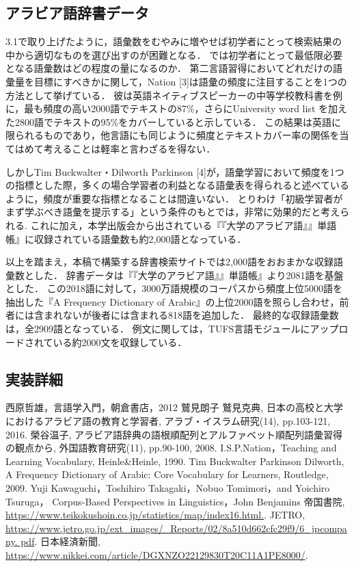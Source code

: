 \documentclass[technicalreport]{ieicej}
\begin{document}
\subsection{アラビア語辞書データ}
3.1で取り上げたように，語彙数をむやみに増やせば初学者にとって検索結果の中から適切なものを選び出すのが困難となる．
では初学者にとって最低限必要となる語彙数はどの程度の量になるのか．
第二言語習得においてどれだけの語彙量を目標にすべきかに関して，Nation [3]は語彙の頻度に注目することを1つの方法として挙げている．
彼は英語ネイティブスピーカーの中等学校教科書を例に，最も頻度の高い2000語でテキストの87\%，さらにUniversity word list を加えた2800語でテキストの95\%をカバーしていると示している．
この結果は英語に限られるものであり，他言語にも同じように頻度とテキストカバー率の関係を当てはめて考えることは軽率と言わざるを得ない．

しかしTim Buckwalter・Dilworth Parkinson [4]が，語彙学習において頻度を1つの指標とした際，多くの場合学習者の利益となる語彙表を得られると述べているように，頻度が重要な指標となることは間違いない．
とりわけ「初級学習者がまず学ぶべき語彙を提示する」という条件のもとでは，非常に効果的だと考えられる.
これに加え，本学出版会から出されている『『大学のアラビア語』』単語帳』に収録されている語彙数も約2,000語となっている．

以上を踏まえ，本稿で構築する辞書検索サイトでは2,000語をおおまかな収録語彙数とした．
辞書データは『『大学のアラビア語』』単語帳』より2081語を基盤とした．
この2018語に対して，3000万語規模のコーパスから頻度上位5000語を抽出した『A Frequency Dictionary of Arabic』の上位2000語を照らし合わせ，前者には含まれないが後者には含まれる818語を追加した．
最終的な収録語彙数は，全2909語となっている．
例文に関しては，TUFS言語モジュール\cite{kawaguchi2007}にアップロードされている約2000文を収録している．

\subsection{実装詳細}


\begin{thebibliography}{99}
西原哲雄，言語学入門，朝倉書店，2012
鷲見朗子 鷲見克典, 日本の高校と大学におけるアラビア語の教育と学習者, アラブ・イスラム研究(14), pp.103-121, 2016.
榮谷温子, アラビア語辞典の語根順配列とアルファベット順配列語彙習得の観点から, 外国語教育研究(11), pp.90-100, 2008.
I.S.P.Nation，Teaching and Learning Vocabulary, Heinle\&Heinle, 1990. 
Tim Buckwalter  Parkinson Dilworth, A Frequency Dictionary of Arabic: Core Vocabulary for Learners, Routledge, 2009.
Yuji Kawaguchi，Toshihiro Takagaki，Nobuo Tomimori，and Yoichiro Tsuruga，
Corpus-Based Perspectives in Linguistics，John Benjamins
帝国書院, \url{https://www.teikokushoin.co.jp/statistics/map/index16.html.}.
JETRO, \url{https://www.jetro.go.jp/ext_images/_Reports/02/8a510d662cfc29f9/6_jpcompany. pdf}.
日本経済新聞, \url{https://www.nikkei.com/article/DGXNZO22129830T20C11A1PE8000/}.
\end{thebibliography}
\end{document}
